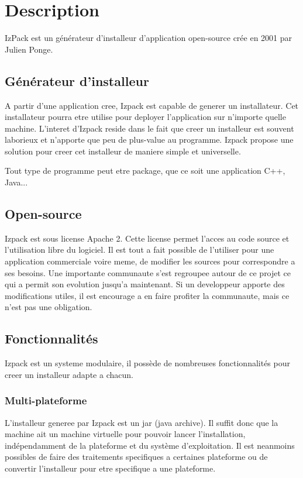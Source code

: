 \section{Description}
IzPack est un générateur d'installeur d'application open-source crée en 2001 par Julien Ponge.
\subsection{Générateur d'installeur}
A partir d'une application cree, Izpack est capable de generer un installateur. Cet installateur pourra etre utilise pour deployer l'application sur n'importe quelle machine. L'interet d'Izpack reside dans le fait que creer un installeur est souvent laborieux et n'apporte que peu de plus-value au programme. Izpack propose une solution pour creer cet installeur de maniere simple et universelle. 

Tout type de programme peut etre package, que ce soit une application C++, Java...
\subsection{Open-source}
Izpack est sous license Apache 2. Cette license permet l'acces au code source et l'utilisation libre du logiciel. Il est tout a fait possible de l'utiliser pour une application commerciale voire meme, de modifier les sources pour correspondre a ses besoins. Une importante communaute s'est regroupee autour de ce projet ce qui a permit son evolution jusqu'a maintenant. Si un developpeur apporte des modifications utiles, il est encourage a en faire profiter la communaute, mais ce n'est pas une obligation.
\subsection{Fonctionnalités}
Izpack est un systeme modulaire, il possède de nombreuses fonctionnalités pour creer un installeur adapte a chacun.
\subsubsection{Multi-plateforme}
L'installeur generee par Izpack est un jar (java archive). Il suffit donc que la machine ait un machine virtuelle pour pouvoir lancer l'installation, indépendamment de la plateforme et du système d'exploitation. Il est neanmoins possibles de faire des traitements specifiques a certaines plateforme ou de convertir l'installeur pour etre specifique a une plateforme. 
